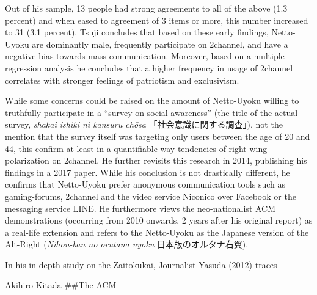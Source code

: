 \documentclass[10pt,british,A4paper,,openany]{memoir}
\begin{document}
Out of his sample, 13 people had strong agreements to all of the above
(1.3 percent) and when eased to agreement of 3 items or more, this
number increased to 31 (3.1 percent). Tsuji concludes that based on
these early findings, Netto-Uyoku are dominantly male, frequently
participate on 2channel, and have a negative bias towards mass
communication. Moreover, based on a multiple regression analysis he
concludes that a higher frequency in usage of 2channel correlates with
stronger feelings of patriotism and exclusivism.

While some concerns could be raised on the amount of Netto-Uyoku willing
to truthfully participate in a ``survey on social awareness'' (the title
of the actual survey, \emph{shakai ishiki ni kansuru chōsa}
「社会意識に関する調査」), not the mention that the survey itself was
targeting only users between the age of 20 and 44, this confirm at least
in a quantifiable way tendencies of right-wing polarization on 2channel.
He further revisits this research in 2014, publishing his findings in a
2017 paper. While his conclusion is not drastically different, he
confirms that Netto-Uyoku prefer anonymous communication tools such as
gaming-forums, 2channel and the video service Niconico over Facebook or
the messaging service LINE. He furthermore views the neo-nationalist ACM
demonstrations (occurring from 2010 onwards, 2 years after his original
report) as a real-life extension and refers to the Netto-Uyoku as the
Japanese version of the Alt-Right (\emph{Nihon-ban no orutana uyoku}
日本版のオルタナ右翼).

In his in-depth study on the Zaitokukai, Journalist Yasuda
(\protect\hyperlink{ref-yasuda_eng:_2012}{2012}) traces

Akihiro Kitada \#\#The ACM
\end{document}
